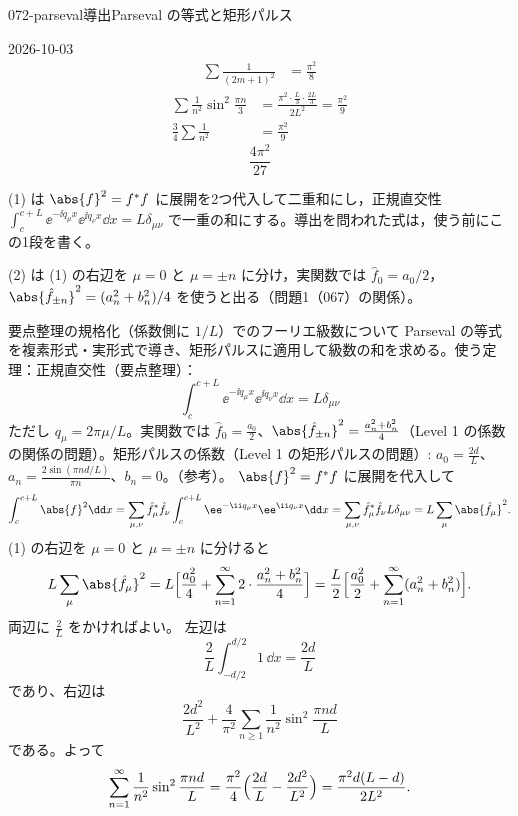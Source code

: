 \documentclass[uplatex,dvipdfmx,a4paper,11pt]{jsarticle}
\begin{document}
\begin{mondai}{072-parseval}{導出}{Parseval の等式と矩形パルス}
\begin{kotaeutsushi}{2026-10-03}
\begin{align*}
  \sum\frac{1}{(2m+1)^{2}}&=\frac{\pi^{2}}{8}
\end{align*}
\begin{align*}
  \sum\frac{1}{n^{2}}\sin^{2}\frac{\pi n}{3}&=\frac{\pi^{2}\cdot\frac{L}{3}\cdot\frac{2L}{3}}{2L^{2}}=\frac{\pi^{2}}{9}\\
  \frac{3}{4}\sum\frac{1}{n^{2}}&=\frac{\pi^{2}}{9}
\end{align*}
\[ \frac{4\pi^{2}}{27} \]
\end{kotaeutsushi}
\begin{kizuki}
\item (1) は $\abs{f}^{2}=f^{*}f$ に展開を2つ代入して二重和にし，正規直交性 $\int_c^{c+L}\ee^{-\ii q_{\mu}x}\ee^{\ii q_{\nu}x}\dd x=L\delta_{\mu\nu}$ で一重の和にする。導出を問われた式は，使う前にこの1段を書く。
\item (2) は (1) の右辺を $\mu=0$ と $\mu=\pm n$ に分け，実関数では $\hat{f}_0=a_0/2$，$\abs{\hat{f}_{\pm n}}^{2}=(a_n^{2}+b_n^{2})/4$ を使うと出る（問題1（067）の関係）。
\end{kizuki}
\begin{tadashii}
\houshin 要点整理の規格化（係数側に $1/L$）でのフーリエ級数について Parseval の等式を複素形式・実形式で導き、矩形パルスに適用して級数の和を求める。使う定理：正規直交性（要点整理）：
\[
\int_{c}^{c+L}\ee^{-\ii q_{\mu}x}\ee^{\ii q_{\nu}x}\dd x=L\delta_{\mu\nu}
\]
ただし $q_{\mu}=2\pi\mu/L$。実関数では $\hat{f}_0=\frac{a_0}{2}$、$\abs{\hat{f}_{\pm n}}^{2}=\frac{a_n^{2}+b_n^{2}}{4}$（Level 1 の係数の関係の問題）。矩形パルスの係数（Level 1 の矩形パルスの問題）: $a_0=\frac{2d}{L}$、$a_n=\frac{2\sin(\pi nd/L)}{\pi n}$、$b_n=0$。（参考）。 %
\keisan
{} $\abs{f}^{2}=f^{*}f$ に展開を代入して
\[
\int_{c}^{c+L}\abs{f}^{2}\dd x=\sum_{\mu,\nu}\hat{f}_{\mu}^{*}\hat{f}_{\nu}\int_{c}^{c+L}\ee^{-\ii q_{\mu}x}\ee^{\ii q_{\nu}x}\dd x=\sum_{\mu,\nu}\hat{f}_{\mu}^{*}\hat{f}_{\nu}L\delta_{\mu\nu}=L\sum_{\mu}\abs{\hat{f}_{\mu}}^{2}.
\]
 (1) の右辺を $\mu=0$ と $\mu=\pm n$ に分けると
\[
L\sum_{\mu}\abs{\hat{f}_{\mu}}^{2}=L\Bigl[\frac{a_0^{2}}{4}+\sum_{n=1}^{\infty}2\cdot\frac{a_n^{2}+b_n^{2}}{4}\Bigr]=\frac{L}{2}\Bigl[\frac{a_0^{2}}{2}+\sum_{n=1}^{\infty}(a_n^{2}+b_n^{2})\Bigr].
\]
両辺に $\frac{2}{L}$ をかければよい。
 左辺は
\[
\frac{2}{L}\int_{-d/2}^{d/2}1\,\dd x=\frac{2d}{L}
\]
であり、右辺は
\[
\frac{2d^{2}}{L^{2}}+\frac{4}{\pi^{2}}\sum_{n\ge1}\frac{1}{n^{2}}\sin^{2}\frac{\pi nd}{L}
\]
である。よって
\[
\sum_{n=1}^{\infty}\frac{1}{n^{2}}\sin^{2}\frac{\pi nd}{L}=\frac{\pi^{2}}{4}\Bigl(\frac{2d}{L}-\frac{2d^{2}}{L^{2}}\Bigr)=\frac{\pi^{2}d(L-d)}{2L^{2}}.
\]
\end{tadashii}
\end{mondai}
\end{document}
